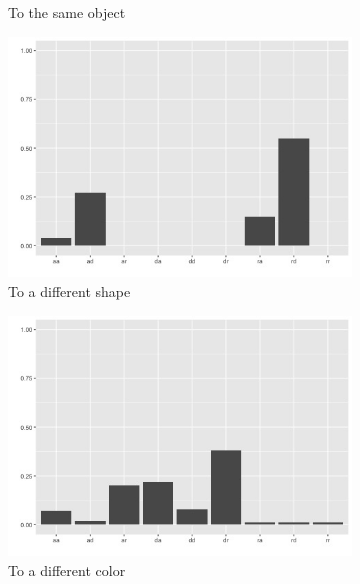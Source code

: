 \documentclass{article}
\begin{document}
\begin{figure}[h!]
\begin{subfigure}[t]{0.25\textwidth}
    \caption{To the same object} \label{fig:agg_g6}
  \end{subfigure}

  \vspace{1em}
  \begin{subfigure}[t]{0.25\textwidth}
    \centering
    \includegraphics[width=\linewidth]{agg_g2} 
    \caption{To a different shape} \label{fig:agg_g2}
  \end{subfigure}
  \begin{subfigure}[t]{0.25\textwidth}
    \centering
    \includegraphics[width=\linewidth]{agg_g4} 
    \caption{To a different color} \label{fig:agg_g4}
  \end{subfigure}
  \begin{subfigure}[t]{0.25\textwidth}
    \centering

\end{subfigure}
\end{figure}
\end{document}
